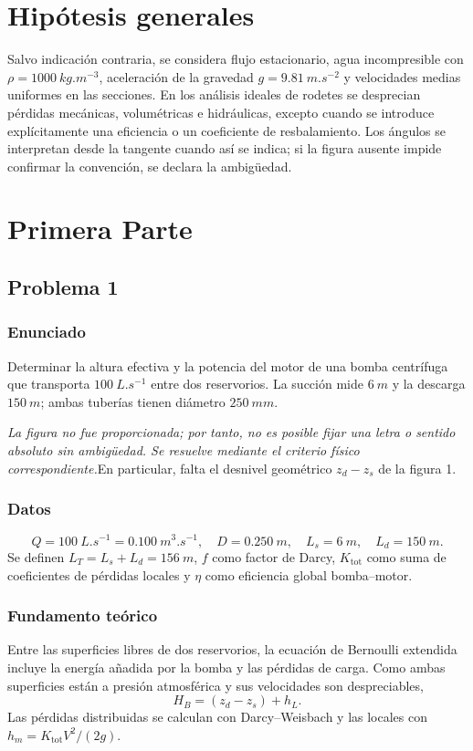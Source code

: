 \documentclass[12pt]{article}
\newcommand{\figuraFaltante}{\emph{La figura no fue proporcionada; por tanto, no es posible fijar una letra o sentido absoluto sin ambigüedad. Se resuelve mediante el criterio físico correspondiente.}}
\begin{document}
\section*{Hipótesis generales}
Salvo indicación contraria, se considera flujo estacionario, agua incompresible con
$\rho=\SI{1000}{kg.m^{-3}}$, aceleración de la gravedad $g=\SI{9.81}{m.s^{-2}}$ y
velocidades medias uniformes en las secciones. En los análisis ideales de rodetes se
desprecian pérdidas mecánicas, volumétricas e hidráulicas, excepto cuando se introduce
explícitamente una eficiencia o un coeficiente de resbalamiento. Los ángulos se interpretan
desde la tangente cuando así se indica; si la figura ausente impide confirmar la convención,
se declara la ambigüedad.

\section{Primera Parte}

\subsection{Problema 1}

\subsubsection*{Enunciado}
Determinar la altura efectiva y la potencia del motor de una bomba centrífuga que transporta
$\SI{100}{L.s^{-1}}$ entre dos reservorios. La succión mide $\SI{6}{m}$ y la descarga
$\SI{150}{m}$; ambas tuberías tienen diámetro $\SI{250}{mm}$.

\figuraFaltante En particular, falta el desnivel geométrico $z_d-z_s$ de la figura 1.

\subsubsection*{Datos}
\[
Q=\SI{100}{L.s^{-1}}=\SI{0.100}{m^3.s^{-1}},\quad
D=\SI{0.250}{m},\quad L_s=\SI{6}{m},\quad L_d=\SI{150}{m}.
\]
Se definen $L_T=L_s+L_d=\SI{156}{m}$, $f$ como factor de Darcy,
$K_{\mathrm{tot}}$ como suma de coeficientes de pérdidas locales y $\eta$ como eficiencia
global bomba--motor.

\subsubsection*{Fundamento teórico}
Entre las superficies libres de dos reservorios, la ecuación de Bernoulli extendida incluye
la energía añadida por la bomba y las pérdidas de carga. Como ambas superficies están a
presión atmosférica y sus velocidades son despreciables,
\[
H_B=(z_d-z_s)+h_L.
\]
Las pérdidas distribuidas se calculan con Darcy--Weisbach y las locales con
$h_m=K_{\mathrm{tot}}V^2/(2g)$.
\end{document}
